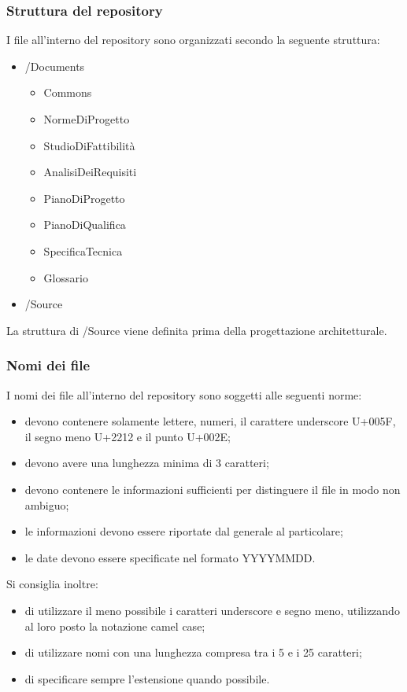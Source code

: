 		\subsubsection{Struttura del repository}
				I file all’interno del repository sono organizzati secondo la seguente struttura:
				\begin{itemize}
					\item /Documents
					\begin{itemize}
						\item Commons
						\item NormeDiProgetto
						\item StudioDiFattibilità
						\item AnalisiDeiRequisiti
						\item PianoDiProgetto
						\item PianoDiQualifica
						\item SpecificaTecnica
						\item Glossario
					\end{itemize}
					\item /Source
				\end{itemize}
				La struttura di /Source viene definita prima della progettazione architetturale.

		\subsubsection{Nomi dei file}
				I nomi dei file all’interno del repository sono soggetti alle seguenti norme:
				\begin{itemize}
					\item devono contenere solamente lettere, numeri, il carattere underscore U+005F, il segno meno U+2212 e il punto U+002E;
					\item devono avere una lunghezza minima di 3 caratteri;
					\item devono contenere le informazioni sufficienti per distinguere il file in modo non ambiguo;
					\item le informazioni devono essere riportate dal generale al particolare;
					\item le date devono essere specificate nel formato YYYYMMDD.
				\end{itemize}
				Si consiglia inoltre:
				\begin{itemize}
					\item di utilizzare il meno possibile i caratteri underscore e segno meno, utilizzando al loro posto la notazione camel case;
					\item di utilizzare nomi con una lunghezza compresa tra i 5 e i 25 caratteri;
					\item di specificare sempre l’estensione quando possibile.
				\end{itemize}
